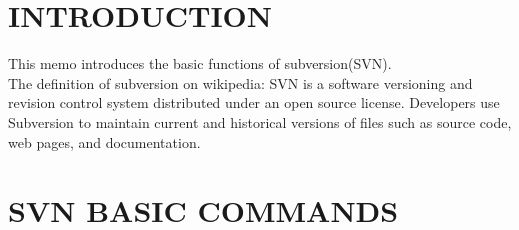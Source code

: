 \newcommand{\WorkWeek}{1252} %
\newcommand{\BossName}{Arden Chang} %
\newcommand{\BossInitials}{ARDN} %
\newcommand{\Author}{Qiling Bo} %
\newcommand{\AuthorInitials}{QIBO} %
\newcommand{\MemoNumber}{077} %
\newcommand{\Subject}{TEST SOFTWARE SOURCE CODE VERSION CONTROL INTRODUCTION} %
\newcommand{\Category}{Trackpad, Version Control} %
\newcommand{\Distribution}{PZHO, MZFA, WEIQ, ARDN, RQB} %





\maketitle


\section{INTRODUCTION}
This memo introduces the basic functions of subversion(SVN). \\
The definition of subversion on wikipedia:
SVN is a software versioning and revision control system distributed under an open source license. Developers use Subversion to maintain current and historical versions of files such as source code, web pages, and documentation.

\section{SVN BASIC COMMANDS}

